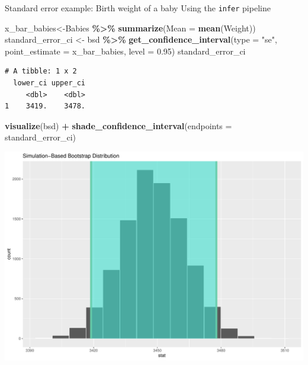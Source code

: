 \documentclass[
  ignorenonframetext,
]{beamer}
\newenvironment{Shaded}{\begin{snugshade}}{\end{snugshade}}
\newcommand{\AttributeTok}[1]{\textcolor[rgb]{0.13,0.29,0.53}{#1}}
\newcommand{\FloatTok}[1]{\textcolor[rgb]{0.00,0.00,0.81}{#1}}
\newcommand{\FunctionTok}[1]{\textcolor[rgb]{0.13,0.29,0.53}{\textbf{#1}}}
\newcommand{\NormalTok}[1]{#1}
\newcommand{\OtherTok}[1]{\textcolor[rgb]{0.56,0.35,0.01}{#1}}
\newcommand{\SpecialCharTok}[1]{\textcolor[rgb]{0.81,0.36,0.00}{\textbf{#1}}}
\newcommand{\StringTok}[1]{\textcolor[rgb]{0.31,0.60,0.02}{#1}}
\begin{document}
\begin{frame}[fragile]{Standard error example: Birth weight of a baby}
\protect\hypertarget{standard-error-example-birth-weight-of-a-baby}{}
Using the \texttt{infer} pipeline

\tiny

\begin{Shaded}
\begin{Highlighting}[]
\NormalTok{x\_bar\_babies}\OtherTok{\textless{}{-}}\NormalTok{Babies }\SpecialCharTok{\%\textgreater{}\%} \FunctionTok{summarize}\NormalTok{(}\AttributeTok{Mean =} \FunctionTok{mean}\NormalTok{(Weight))}
\NormalTok{standard\_error\_ci }\OtherTok{\textless{}{-}}\NormalTok{ bsd }\SpecialCharTok{\%\textgreater{}\%} 
  \FunctionTok{get\_confidence\_interval}\NormalTok{(}\AttributeTok{type =} \StringTok{"se"}\NormalTok{, }\AttributeTok{point\_estimate =}\NormalTok{ x\_bar\_babies, }\AttributeTok{level =} \FloatTok{0.95}\NormalTok{)}
\NormalTok{standard\_error\_ci}
\end{Highlighting}
\end{Shaded}

\begin{verbatim}
# A tibble: 1 x 2
  lower_ci upper_ci
     <dbl>    <dbl>
1    3419.    3478.
\end{verbatim}

\begin{Shaded}
\begin{Highlighting}[]
\FunctionTok{visualize}\NormalTok{(bsd) }\SpecialCharTok{+} 
  \FunctionTok{shade\_confidence\_interval}\NormalTok{(}\AttributeTok{endpoints =}\NormalTok{ standard\_error\_ci)}
\end{Highlighting}
\end{Shaded}

\begin{center}\includegraphics[width=0.7\linewidth,height=0.4\textheight]{Week10_Lect_files/figure-beamer/unnamed-chunk-18-1} \end{center}
\normalsize
\end{frame}
\end{document}
